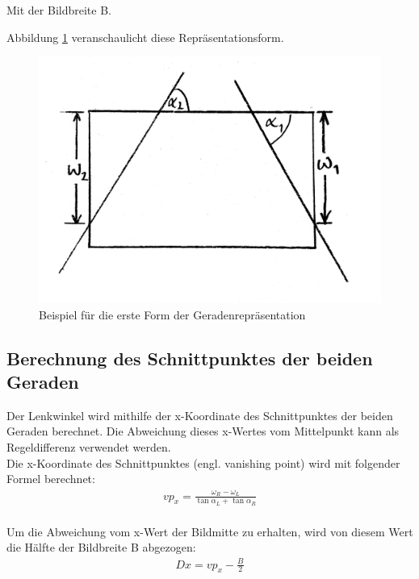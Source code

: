 	Mit der Bildbreite B.
	
	Abbildung \ref{fig:alpha_omega3} veranschaulicht diese Repräsentationsform.
	
		\begin{figure}[H]
		\centering
		\includegraphics[width=.5\linewidth]{images/alpha_omega3.jpg}
		\caption{Beispiel für die erste Form der Geradenrepräsentation}
		\label{fig:alpha_omega3}
	\end{figure}


	\subsection{Berechnung des Schnittpunktes der beiden Geraden}
	
	Der Lenkwinkel wird mithilfe der x-Koordinate des Schnittpunktes der beiden Geraden berechnet. Die Abweichung dieses x-Wertes vom Mittelpunkt kann als Regeldifferenz verwendet werden.\\
	Die x-Koordinate des Schnittpunktes (engl. vanishing point) wird mit folgender Formel berechnet:\\
	
	\begin{align*}
	vp_x=\frac{\omega_R-\omega_L}{\tan{\alpha_L}+\tan{\alpha_R}} \\
	\end{align*}
	
	Um die Abweichung vom x-Wert der Bildmitte zu erhalten, wird von diesem Wert die Hälfte der Bildbreite B abgezogen:\\
	
	\begin{align*}
	Dx=vp_x-\frac{B}{2} \\
	\end{align*}
	
	
	
	
	
	
	
